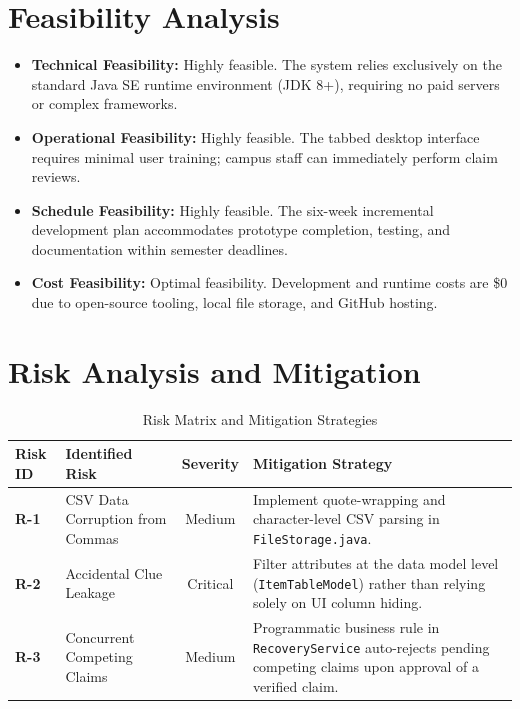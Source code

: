 \documentclass[11pt,a4paper]{article}
\begin{document}
\section{Feasibility Analysis}
\begin{itemize}
    \item \textbf{Technical Feasibility:} Highly feasible. The system relies exclusively on the standard Java SE runtime environment (JDK 8+), requiring no paid servers or complex frameworks.
    \item \textbf{Operational Feasibility:} Highly feasible. The tabbed desktop interface requires minimal user training; campus staff can immediately perform claim reviews.
    \item \textbf{Schedule Feasibility:} Highly feasible. The six-week incremental development plan accommodates prototype completion, testing, and documentation within semester deadlines.
    \item \textbf{Cost Feasibility:} Optimal feasibility. Development and runtime costs are \$0 due to open-source tooling, local file storage, and GitHub hosting.
\end{itemize}

\section{Risk Analysis and Mitigation}
\begin{table}[H]
    \centering
    \caption{Risk Matrix and Mitigation Strategies}
    \begin{tabularx}{\textwidth}{lp{3.5cm}cp{5.5cm}}
        \toprule
        \textbf{Risk ID} & \textbf{Identified Risk} & \textbf{Severity} & \textbf{Mitigation Strategy} \\
        \midrule
        \textbf{R-1} & CSV Data Corruption from Commas & Medium & Implement quote-wrapping and character-level CSV parsing in \texttt{FileStorage.java}. \\
        \textbf{R-2} & Accidental Clue Leakage & Critical & Filter attributes at the data model level (\texttt{ItemTableModel}) rather than relying solely on UI column hiding. \\
        \textbf{R-3} & Concurrent Competing Claims & Medium & Programmatic business rule in \texttt{RecoveryService} auto-rejects pending competing claims upon approval of a verified claim. \\
        \bottomrule
    \end{tabularx}
\end{table}
\end{document}
